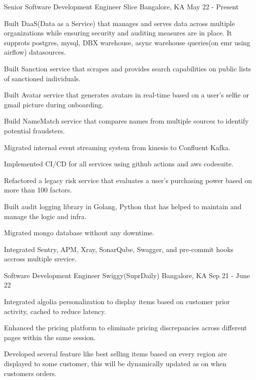 \begin{cventries}
  \cventry
    {Senior Software Development Engineer}
    {Slice}
    {Bangalore, KA}
    {May 22 - Present}
    {
      \begin{cvitems}
        \item {Built DaaS(Data as a Service) that manages and serves data across multiple organizations while ensuring security and auditing measures are in place. It supprots postgres, mysql, DBX warehouse, async warehouse queries(on emr using airflow) datasources.}
        \item {Built Sanction service that scrapes and provides search capabilities on public lists of sanctioned individuals.}
        \item {Built Avatar service that generates avatars in real-time based on a user's selfie or gmail picture during onboarding.}
        \item {Build NameMatch service that compares names from multiple sources to identify potential fraudsters.}
        \item {Migrated internal event streaming system from kinesis to Confluent Kafka.}
        \item {Implemented CI/CD for all services using github actions and aws codesuite.}
        \item {Refactored a legacy risk service that evaluates a user's purchasing power based on more than 100 factors.}
        \item {Built audit logging library in Golang, Python that has helped to maintain and manage the logic and infra.}
        \item {Migrated mongo database without any downtime.}
        \item {Integrated Sentry, APM, Xray, SonarQube, Swagger, and pre-commit hooks accross multiple srevice.}
      \end{cvitems}
    }
  
  \cventry
    {Software Development Engineer}
    {Swiggy(SuprDaily)}
    {Bangalore, KA}
    {Sep 21 - June 22}
    {
      \begin{cvitems}
        \item {Integrated algolia personalization to display items based on customer prior activity, cached to reduce latency.}
        \item {Enhanced the pricing platform to eliminate pricing discrepancies across different pages within the same session.}
        \item {Developed several feature like best selling items based on every region are displayed to some customer, this will be dynamically updated as on when customers orders.}
      \end{cvitems}
    }
  

\end{cventries}
